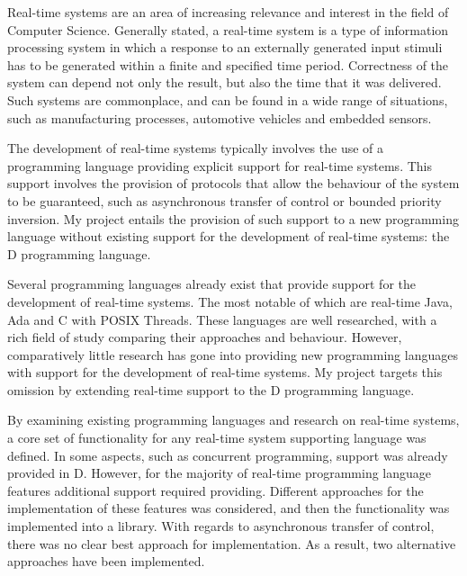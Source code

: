 
Real-time systems are an area of increasing relevance and interest in the field 
of Computer Science. Generally stated, a real-time system is a type of information 
processing system in which a response to an externally generated input stimuli 
has to be generated within a finite and specified time period. Correctness of the 
system can depend not only the result, but also the time that it was delivered. 
Such systems are commonplace, and can be found in a wide range of 
situations, such as manufacturing processes, automotive vehicles and embedded 
sensors. 

The development of real-time systems typically involves the use of a programming 
language providing explicit support for real-time systems. 
This support involves the provision of protocols that allow the behaviour of the 
system to be guaranteed, such as asynchronous transfer of control or bounded priority inversion. 
My project entails the provision of such support to a new programming language
without existing support for the development of real-time systems: 
the D programming language. 

Several programming languages already exist that provide support for the 
development of real-time systems. The most notable of which are 
real-time Java, Ada and C with POSIX Threads. These languages are well researched, 
with a rich field of study comparing their approaches and behaviour. 
However, comparatively little research has gone into providing new programming 
languages with support for the development of real-time systems. My project 
targets this omission by extending real-time support to the D programming language. 

By examining existing programming languages and research on real-time systems, a core set 
of functionality for any real-time system supporting language was defined. 
In some aspects, such as concurrent programming, support was already provided in D. 
However, for the majority of real-time programming language features 
additional support required providing. Different approaches for the implementation 
of these features was considered, and then the functionality was implemented into 
a library. With regards to asynchronous transfer of control, there was no clear 
best approach for implementation. As a result, two alternative approaches have 
been implemented. 

